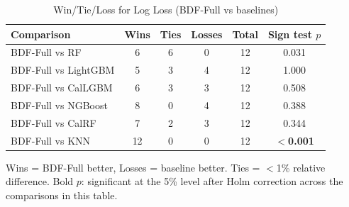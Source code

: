 \begin{table}[htbp]
\centering
\caption{Win/Tie/Loss for Log Loss (BDF-Full vs baselines)}
\label{tab:classification-win-tie-loss}
\begin{tabular}{lccccc}
\toprule
Comparison & Wins & Ties & Losses & Total & Sign test $p$ \\
\midrule
BDF-Full vs RF & 6 & 6 & 0 & 12 & 0.031 \\
BDF-Full vs LightGBM & 5 & 3 & 4 & 12 & 1.000 \\
BDF-Full vs CalLGBM & 6 & 3 & 3 & 12 & 0.508 \\
BDF-Full vs NGBoost & 8 & 0 & 4 & 12 & 0.388 \\
BDF-Full vs CalRF & 7 & 2 & 3 & 12 & 0.344 \\
BDF-Full vs KNN & 12 & 0 & 0 & 12 & \textbf{$<$0.001} \\
\bottomrule
\end{tabular}
\par\smallskip\footnotesize{Wins = BDF-Full better, Losses = baseline better. Ties = $<$1\% relative difference. Bold $p$: significant at the 5\% level after Holm correction across the comparisons in this table.}
\end{table}
